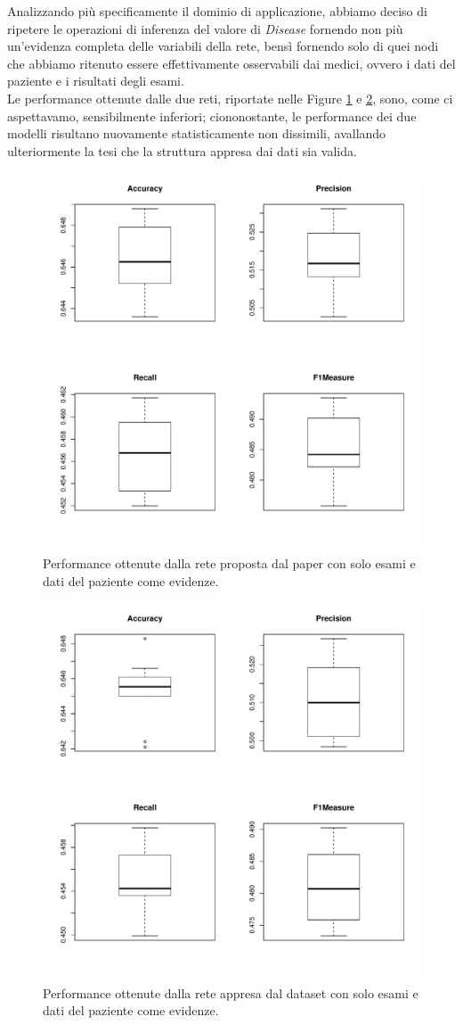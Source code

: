 Analizzando più specificamente il dominio di applicazione, abbiamo deciso di ripetere le operazioni di inferenza del valore di \textit{Disease} fornendo non più un'evidenza completa delle variabili della rete, bensì fornendo solo di quei nodi che abbiamo ritenuto essere effettivamente osservabili dai medici, ovvero i dati del paziente e i risultati degli esami.\\
Le performance ottenute dalle due reti, riportate nelle Figure \ref{fig:paperperformancehalf} e \ref{fig:inducedperformancehalf}, sono, come ci aspettavamo, sensibilmente inferiori; ciononostante, le performance dei due modelli risultano nuovamente statisticamente non dissimili, avallando ulteriormente la tesi che la struttura appresa dai dati sia valida.\\
\begin{figure}
	\centering
	\includegraphics[width=0.7\linewidth]{images/paper_performance_half}
	\caption{Performance ottenute dalla rete proposta dal paper con solo esami e dati del paziente come evidenze.}
	\label{fig:paperperformancehalf}
\end{figure}
\begin{figure}
	\centering
	\includegraphics[width=0.7\linewidth]{images/induced_performance_half}
	\caption{Performance ottenute dalla rete appresa dal dataset con solo esami e dati del paziente come evidenze.}
	\label{fig:inducedperformancehalf}
\end{figure}

